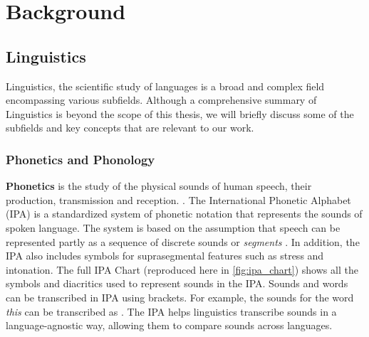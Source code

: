 \chapter{Background}\label{chapter:background}

\section{Linguistics}
Linguistics, the scientific study of languages is a broad and complex field encompassing various subfields. Although a comprehensive summary 
of Linguistics is beyond the scope of this thesis, we will briefly discuss some of the subfields and key concepts that are relevant to our work.

\subsection{Phonetics and Phonology}
\textbf{Phonetics} is the study of the physical sounds of human speech, their production, transmission and reception. \cite{trask2007language}. The International Phonetic Alphabet (IPA) is a standardized system of phonetic notation that represents the sounds of spoken language. The system
is based on the assumption that speech can be represented partly as a sequence of discrete sounds or \textit{segments} \cite{handbookIPA1999}. 
In addition, the IPA also includes symbols for suprasegmental features such as stress and intonation. The full IPA Chart (reproduced here in 
\ref{fig:ipa_chart}) shows all the symbols and diacritics used to represent sounds in the IPA. Sounds and words can be transcribed in IPA 
using \textipa{[ ]} brackets. For example, the sounds for the word \textit{this} can be transcribed as \textipa{[DIs]}. The IPA helps linguistics
transcribe sounds in a language-agnostic way, allowing them to compare sounds across languages.

